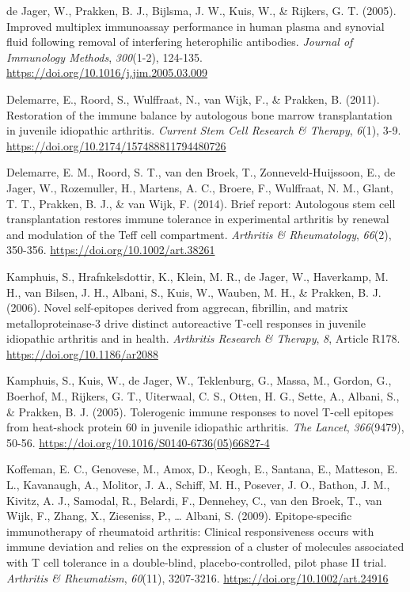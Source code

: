 \documentclass[authordate, editorial, issue]{jote-new-article}
\begin{document}
	de Jager, W., Prakken, B. J., Bijlsma, J. W., Kuis, W., \& Rijkers, G. T. (2005). Improved multiplex immunoassay performance in human plasma and synovial fluid following removal of interfering heterophilic antibodies. \emph{Journal of Immunology Methods},\emph{ 300}(1-2), 124-135. \url{https://doi.org/10.1016/j.jim.2005.03.009}



	Delemarre, E., Roord, S., Wulffraat, N., van Wijk, F., \& Prakken, B. (2011). Restoration of the immune balance by autologous bone marrow transplantation in juvenile idiopathic arthritis. \emph{Current Stem Cell Research \& Therapy},\emph{ 6}(1), 3-9. \url{https://doi.org/10.2174/157488811794480726}



	Delemarre, E. M., Roord, S. T., van den Broek, T., Zonneveld-Huijssoon, E., de Jager, W., Rozemuller, H., Martens, A. C., Broere, F., Wulffraat, N. M., Glant, T. T., Prakken, B. J., \& van Wijk, F. (2014). Brief report: Autologous stem cell transplantation restores immune tolerance in experimental arthritis by renewal and modulation of the Teff cell compartment. \emph{Arthritis \& Rheumatology},\emph{ 66}(2), 350-356. \url{https://doi.org/10.1002/art.38261}



	Kamphuis, S., Hrafnkelsdottir, K., Klein, M. R., de Jager, W., Haverkamp, M. H., van Bilsen, J. H., Albani, S., Kuis, W., Wauben, M. H., \& Prakken, B. J. (2006). Novel self-epitopes derived from aggrecan, fibrillin, and matrix metalloproteinase-3 drive distinct autoreactive T-cell responses in juvenile idiopathic arthritis and in health. \emph{Arthritis Research \& Therapy},\emph{ 8}, Article R178. \url{https://doi.org/10.1186/ar2088}



	Kamphuis, S., Kuis, W., de Jager, W., Teklenburg, G., Massa, M., Gordon, G., Boerhof, M., Rijkers, G. T., Uiterwaal, C. S., Otten, H. G., Sette, A., Albani, S., \& Prakken, B. J. (2005). Tolerogenic immune responses to novel T-cell epitopes from heat-shock protein 60 in juvenile idiopathic arthritis. \emph{The} \emph{Lancet},\emph{ 366}(9479), 50-56. \url{https://doi.org/10.1016/S0140-6736(05)66827-4}



	Koffeman, E. C., Genovese, M., Amox, D., Keogh, E., Santana, E., Matteson, E. L., Kavanaugh, A., Molitor, J. A., Schiff, M. H., Posever, J. O., Bathon, J. M., Kivitz, A. J., Samodal, R., Belardi, F., Dennehey, C., van den Broek, T., van Wijk, F., Zhang, X., Zieseniss, P., … Albani, S. (2009). Epitope-specific immunotherapy of rheumatoid arthritis: Clinical responsiveness occurs with immune deviation and relies on the expression of a cluster of molecules associated with T cell tolerance in a double-blind, placebo-controlled, pilot phase II trial. \emph{Arthritis \& Rheumatism},\emph{ 60}(11), 3207-3216. \url{https://doi.org/10.1002/art.24916}
\end{document}
